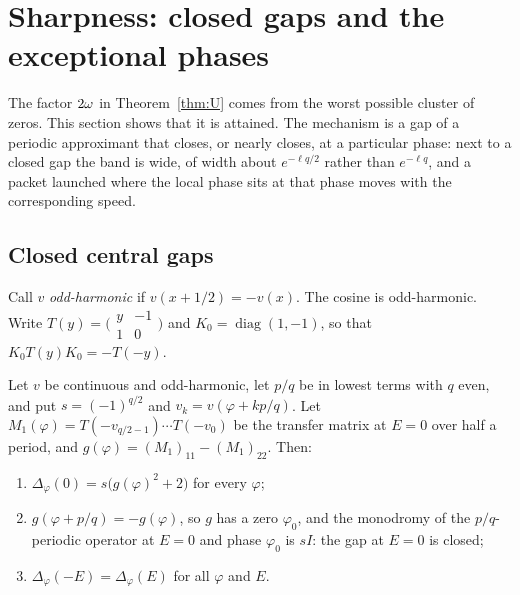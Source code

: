 \section{Sharpness: closed gaps and the exceptional phases}\label{sec:sharp}

The factor $2\omega$ in Theorem~\ref{thm:U} comes from the worst possible cluster of zeros. This section shows that it is attained. The mechanism is a gap of a periodic approximant that closes, or nearly closes, at a particular phase: next to a closed gap the band is wide, of width about $e^{-\ell q/2}$ rather than $e^{-\ell q}$, and a packet launched where the local phase sits at that phase moves with the corresponding speed.

\subsection{Closed central gaps}

Call $v$ \emph{odd-harmonic} if $v(x+1/2)=-v(x)$. The cosine is odd-harmonic. Write $T(y)=\bigl(\begin{smallmatrix}y&-1\\1&0\end{smallmatrix}\bigr)$ and $K_0=\operatorname{diag}(1,-1)$, so that $K_0T(y)K_0=-T(-y)$.

\begin{proposition}\label{prop:G}
Let $v$ be continuous and odd-harmonic, let $p/q$ be in lowest terms with $q$ even, and put $s=(-1)^{q/2}$ and $v_k=v(\varphi+kp/q)$. Let $M_1(\varphi)=T(-v_{q/2-1})\cdots T(-v_0)$ be the transfer matrix at $E=0$ over half a period, and $g(\varphi)=(M_1)_{11}-(M_1)_{22}$. Then:
\begin{enumerate}
\item $\Delta_\varphi(0)=s\bigl(g(\varphi)^2+2\bigr)$ for every $\varphi$;
\item $g(\varphi+p/q)=-g(\varphi)$, so $g$ has a zero $\varphi_0$, and the monodromy of the $p/q$-periodic operator at $E=0$ and phase $\varphi_0$ is $sI$: the gap at $E=0$ is closed;
\item $\Delta_\varphi(-E)=\Delta_\varphi(E)$ for all $\varphi$ and $E$.
\end{enumerate}
\end{proposition}

